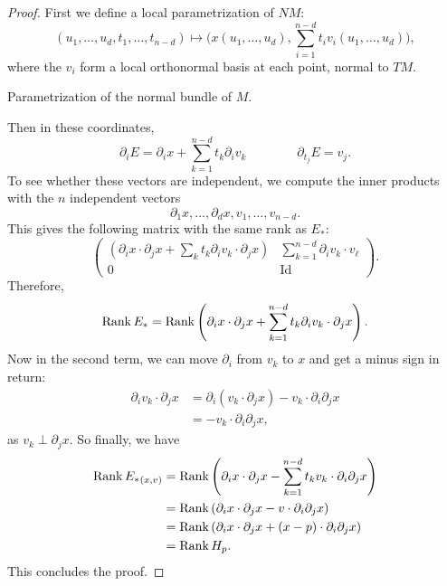 \begin{proof}
    First we define a local parametrization of $NM$:
    \[
        (u_1, \ldots, u_d, t_1, \ldots, t_{n-d}) \mapsto \Big(x(u_1, \ldots, u_d), \sum_{i=1}^{n-d} t_i v_i(u_1, \ldots, u_{d})\Big)
    ,\] 
    where the $v_i$ form a local orthonormal basis at each point, normal to $TM$.
\begin{marginfigure}
    \centering
    \caption{Parametrization of the normal bundle of $M$.}
    \label{fig:abundance-of-morse-functions-parametrization-of-the-normal-bundle}
\end{marginfigure}
    Then in these coordinates,
    \[
        \partial_i E = \partial_i x  + \sum_{k=1}^{n-d} t_k \partial_i v_k 
        \qquad
        \qquad
        \partial_{t_j} E  = v_j
    .\]
    To see whether these vectors are independent, we compute the inner products with the $n$ independent vectors
    \[
    \partial_1 x , \ldots, \partial_d x , v_1, \ldots, v_{n-d}
    .\] 
    This gives the following matrix with the same rank as $E_*$:
     \[
    \begin{pmatrix}
        (\partial_i x\cdot \partial_j x + \sum_k t_k \partial_iv_{k} \cdot \partial_j x) &  \sum_{k=1}^{n-d} \partial_i v_{k} \cdot  v_\ell\\
        0 & \operatorname{Id}
    \end{pmatrix}
    .\] 
    Therefore,
    \[
    \operatorname{Rank} E_* = \operatorname{Rank} \left(\partial_i x\cdot \partial_j x + \sum_{k=1}^{n-d} t_k \partial_iv_{k} \cdot \partial_j x\right)  
    .\] 
    Now in the second term, we can move $\partial_i$ from $v_k$ to $x$ and get a minus sign in return:
    \begin{align*}
        \partial_iv_{k} \cdot \partial_j x &= \partial_i (v_k \cdot \partial_j x)  - v_k \cdot  \partial_i \partial_j x\\
                               &= - v_k \cdot  \partial_i \partial_j x
    ,\end{align*} 
    as $v_k \perp \partial_j x$.
    So finally, we have
    \begin{align*}
    \operatorname{Rank} {E_*}_{(x, v)}
        &= \operatorname{Rank} \left(\partial_i x\cdot \partial_j x - \sum_{k=1}^{n-d} t_k v_{k} \cdot \partial_i \partial_j x\right)  \\
        &= \operatorname{Rank} \left(\partial_i x\cdot \partial_j x - v \cdot \partial_i \partial_j x\right)  \\
        &= \operatorname{Rank} \left(\partial_i x\cdot \partial_j x + (x-p) \cdot \partial_i \partial_j x\right)  \\
        &= \operatorname{Rank} H_p
    .\end{align*} 
    This concludes the proof.
\end{proof}

